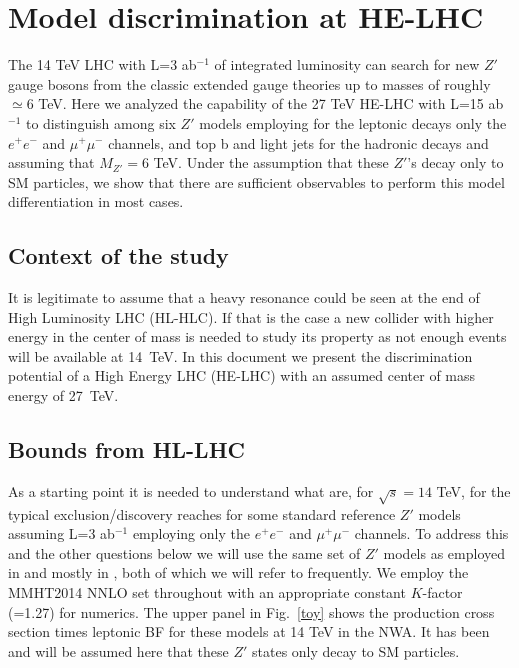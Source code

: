 \section{Model discrimination at HE-LHC}
\label{sec:modeldiscri}

The 14 TeV LHC with L=3 ab$^{-1}$ of integrated luminosity can search for new $Z'$ gauge bosons from the classic extended gauge theories up to masses 
of roughly $\simeq 6$ TeV.  Here we analyzed the capability of the 27 TeV HE-LHC with L=15 ab$^{-1}$ to distinguish among six $Z'$ models employing for the leptonic decays only 
the $e^+e^-$ and $\mu^+\mu^-$ channels, and top b and light jets for the hadronic decays and assuming that $M_{Z'}=6$ TeV. Under the assumption that these $Z'$'s decay only to SM particles,  we show that 
there are sufficient observables to perform this model differentiation in most cases. 

\subsection{Context of the study}
It is legitimate to assume that a heavy resonance could be seen at the end of High Luminosity LHC (HL-HLC). If that is the case a new collider with higher energy 
in the center of mass is needed to study its property as not enough events will be available at 14~TeV. In this document we present the discrimination potential of a High Energy LHC (HE-LHC)
with an assumed center of mass energy of 27~TeV.


\subsection{Bounds from HL-LHC}
As a starting point it is needed to understand what are, for $\sqrt s=14$ TeV, for the typical exclusion/discovery reaches for some standard reference $Z'$ models assuming L=3 ab$^{-1}$ 
employing only the $e^+e^-$ and $\mu^+\mu^-$ channels. To address this and the other questions below we will use the same set of $Z'$ models as employed 
in \cite{Rizzo:2014xma} and mostly in \cite{Han:2013mra}, both of which we will refer to frequently. We employ the MMHT2014 NNLO set \cite{Harland-Lang:2014zoa} 
throughout with an appropriate constant $K$-factor (=1.27) for numerics. 
The upper panel in Fig.~\ref{toy} shows the production cross section times leptonic BF for these models at 14 TeV in the NWA. It has 
been and will be assumed here that these $Z'$ states only decay to SM particles. 

